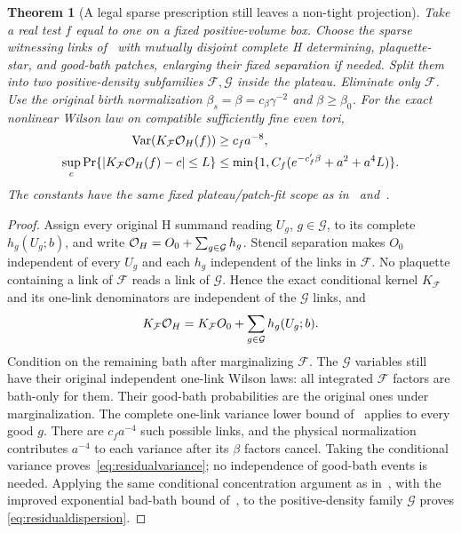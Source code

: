 \documentclass[11pt,letterpaper]{article}
\theoremstyle{plain}
\newtheorem{theorem}{Theorem}[section]
\theoremstyle{remark}\newtheorem{remark}[theorem]{Scope}
\DeclareMathOperator{\Var}{Var}\DeclareMathOperator{\Cov}{Cov}
\begin{document}
\begin{theorem}[A legal sparse prescription still leaves a non-tight projection]
Take a real test $f$ equal to one on a fixed positive-volume box. Choose the
sparse witnessing links of~\cite[\S2.1]{ND} with mutually disjoint complete H determining,
plaquette-star, and good-bath patches, enlarging their fixed separation if
needed. Split them into two positive-density subfamilies
$\mathcal F,\mathcal G$ inside the plateau. Eliminate only $\mathcal F$.
Use the original birth normalization $\beta_s=\beta=c_\beta\gamma^{-2}$
and $\beta\ge\beta_0$. For the exact nonlinear Wilson law on compatible
sufficiently fine even tori,
\begin{align}
\Var(K_{\mathcal F}\OH(f))&\ge c_fa^{-8},\label{eq:residualvariance}\\
\sup_c\Pr\{|K_{\mathcal F}\OH(f)-c|\le L\}
&\le\min\{1,C_f(e^{-c'_f\beta}+a^2+a^4L)\}.
\label{eq:residualdispersion}
\end{align}
The constants have the same fixed plateau/patch-fit scope as in~\cite[\S2]{ND} and~\cite[\S2]{PW}.
\end{theorem}
\begin{proof}
Assign every original H summand reading $U_g$, $g\in\mathcal G$, to its
complete $h_g(U_g;b)$, and write
$\mathcal O_H=O_0+\sum_{g\in\mathcal G}h_g$. Stencil separation makes $O_0$
independent of every $U_g$ and each $h_g$ independent of the links in
$\mathcal F$. No plaquette containing a link of $\mathcal F$ reads a
link of $\mathcal G$. Hence the exact conditional kernel $K_{\mathcal F}$
and its one-link denominators are independent of the $\mathcal G$ links,
and
\begin{equation}
K_{\mathcal F}\mathcal O_H=K_{\mathcal F}O_0
+\sum_{g\in\mathcal G}h_g(U_g;b).
\label{eq:unchangedG}
\end{equation}
Condition on the remaining bath after marginalizing $\mathcal F$. The
$\mathcal G$ variables still have their original independent one-link
Wilson laws: all integrated $\mathcal F$ factors are bath-only for them.
Their good-bath probabilities are the original ones under marginalization.
The complete one-link variance lower bound of~\cite[\S2.3]{ND} applies to every good $g$.
There are $c_fa^{-4}$ such possible links, and the physical normalization
contributes $a^{-4}$ to each variance after its $\beta$ factors cancel.
Taking the conditional variance proves~\eqref{eq:residualvariance}; no
independence of good-bath events is needed. Applying the same conditional
concentration argument as in~\cite[\S2.4]{ND}, with the improved exponential
bad-bath bound of~\cite[\S2]{PW}, to the positive-density family $\mathcal G$ proves
\eqref{eq:residualdispersion}.
\end{proof}
\end{document}
